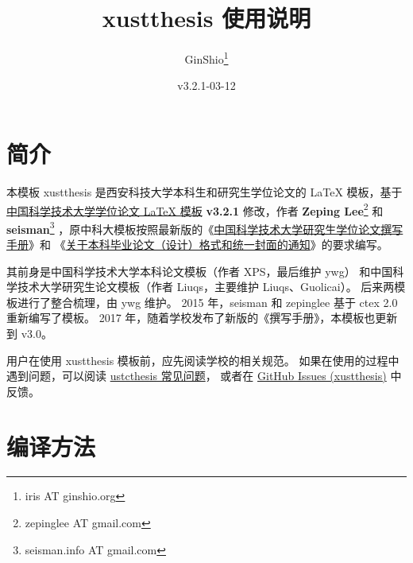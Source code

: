 \documentclass[a4paper]{ltxdoc}
\DeclareRobustCommand\pkg{\textsf}
\DeclareRobustCommand\cls{\textsf}
\begin{document}
\title{\cls{xustthesis} 使用说明}
\author{GinShio\thanks{iris AT ginshio.org}}
\date{v3.2.1-03-12}
\maketitle



\section{简介}

本模板 \cls{xustthesis} 是西安科技大学本科生和研究生学位论文的 \LaTeX{}
模板，基于 \href{https://github.com/ustctug/ustcthesis}{中国科学技术大学学位论文 LaTeX 模板} \textbf{v3.2.1} 修改，作者 \textbf{Zeping Lee}\footnote{zepinglee AT gmail.com} 和 \textbf{seisman}\footnote{seisman.info AT gmail.com} ，原中科大模板按照最新版的《\href{http://gradschool.ustc.edu.cn/ylb/material/xw/wdxz/32.pdf}
{中国科学技术大学研究生学位论文撰写手册}》和
《\href{http://www.teach.ustc.edu.cn/document/doc-administration/4032.html}
{关于本科毕业论文（设计）格式和统一封面的通知}》的要求编写。

其前身是中国科学技术大学本科论文模板（作者 XPS，最后维护 ywg）
和中国科学技术大学研究生论文模板（作者 Liuqs，主要维护 Liuqs、Guolicai）。
后来两模板进行了整合梳理，由 ywg 维护。
2015 年，seisman 和 zepinglee 基于 \pkg{ctex} 2.0 重新编写了模板。
2017 年，随着学校发布了新版的《撰写手册》，本模板也更新到 v3.0。

用户在使用 \pkg{xustthesis} 模板前，应先阅读学校的相关规范。
如果在使用的过程中遇到问题，可以阅读
\href{https://github.com/ustctug/ustcthesis/wiki}{ustcthesis 常见问题}，
或者在 \href{https://github.com/GinShio/xustthesis/issues}{GitHub Issues (xustthesis)}
中反馈。



\section{编译方法}
\end{document}

